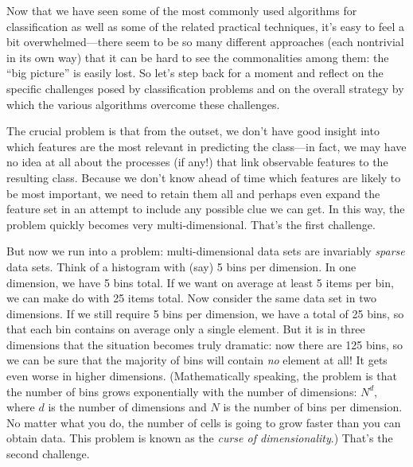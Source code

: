  
Now that we have seen some of the most commonly used algorithms for
classification as well as some of the related practical techniques,
it's easy to feel a bit overwhelmed---there seem to be so many
different approaches (each nontrivial in its own way) that it can be
hard to see the commonalities among them: the ``big picture'' is
easily lost. So let's step back for a moment and reflect on the
specific challenges posed by classification problems and on the
overall strategy by which the various algorithms overcome these
challenges.


The crucial problem is that from the outset, we don't have good insight
into which features are the most relevant in predicting the class---in
fact, we may have no idea at all about the processes (if any!) that
link observable features to the resulting class. Because we don't know
ahead of time which features are likely to be most important, we need
to retain them all and perhaps even expand the feature set in an
attempt to include any possible clue we can get. In this way, the
problem quickly becomes very multi-dimensional. That's the first
challenge.

But now we run into a problem: multi-dimensional data sets are
invariably \emph{sparse} data sets. Think of a histogram with (say) 5
bins per dimension. In one dimension, we have 5 bins total. If we want
on average at least 5 items per bin, we can make do with 25 items
total. Now consider the same data  set in two dimensions. If we still
require 5 bins per dimension, we have a total of 25 bins, so that each
bin contains on average only a single element. But it is in three
dimensions that the situation becomes truly dramatic: now there are
125 bins, so we can be sure that the majority of bins will contain
\emph{no} element at all! It gets even worse in higher dimensions.
(Mathematically speaking, the problem is that the number of bins grows
exponentially with the number of dimensions: $N^d$, where $d$ is the
number of dimensions and $N$ is the number of bins per dimension. No
matter what you do, the number of cells is going to grow faster than
you can obtain data.  This problem is known as the \emph{curse of
  dimensionality}.) That's the second challenge.

